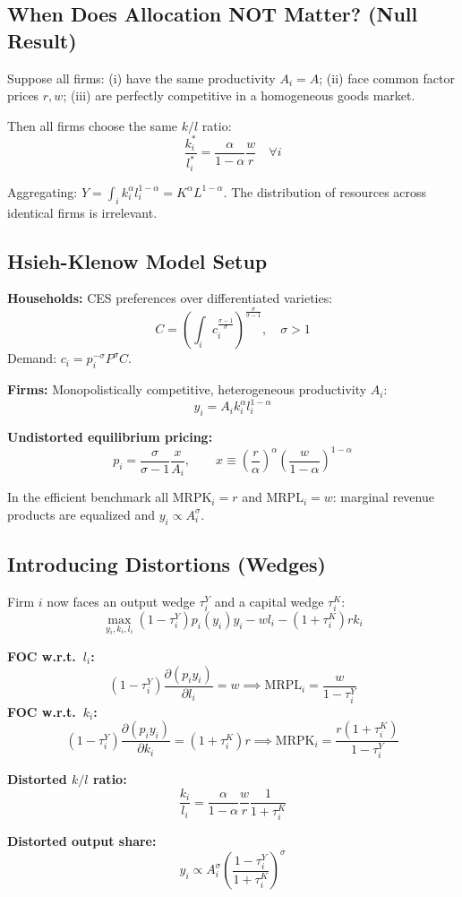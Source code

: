 \documentclass[a4paper,11pt]{article}
\newcommand{\MRPK}{\mathrm{MRPK}}
\newcommand{\MRPL}{\mathrm{MRPL}}
\begin{document}
\subsection*{When Does Allocation NOT Matter? (Null Result)}

Suppose all firms: (i) have the same productivity $A_i = A$; (ii) face common factor prices $r, w$; (iii) are perfectly competitive in a homogeneous goods market.

Then all firms choose the same $k/l$ ratio:
\[
\frac{k_i^*}{l_i^*} = \frac{\alpha}{1-\alpha}\frac{w}{r} \quad \forall i
\]

Aggregating: $Y = \int_i k_i^\alpha l_i^{1-\alpha} = K^\alpha L^{1-\alpha}$. The distribution of resources across identical firms is irrelevant.

\subsection*{Hsieh-Klenow Model Setup}

\textbf{Households:} CES preferences over differentiated varieties:
\[
C = \left(\int_i c_i^{\frac{\sigma-1}{\sigma}}\right)^{\frac{\sigma}{\sigma-1}}, \quad \sigma > 1
\]
Demand: $c_i = p_i^{-\sigma} P^\sigma C$.

\textbf{Firms:} Monopolistically competitive, heterogeneous productivity $A_i$:
\[
y_i = A_i k_i^\alpha l_i^{1-\alpha}
\tag{Firm Technology}
\]

\textbf{Undistorted equilibrium pricing:}
\[
p_i = \frac{\sigma}{\sigma-1} \frac{x}{A_i}, \qquad x \equiv \left(\frac{r}{\alpha}\right)^\alpha \left(\frac{w}{1-\alpha}\right)^{1-\alpha}
\]

In the efficient benchmark all $\MRPK_i = r$ and $\MRPL_i = w$: marginal revenue products are equalized and $y_i \propto A_i^\sigma$.

\subsection*{Introducing Distortions (Wedges)}

Firm $i$ now faces an output wedge $\tau_i^Y$ and a capital wedge $\tau_i^K$:
\[
\max_{y_i, k_i, l_i} (1-\tau_i^Y) p_i(y_i) y_i - w l_i - (1+\tau_i^K) r k_i
\]

\begin{derivationbox}[title={Derivation: Distorted MRPs}]
\textbf{FOC w.r.t.\ $l_i$:}
\[
(1-\tau_i^Y)\frac{\partial(p_i y_i)}{\partial l_i} = w \implies \MRPL_i = \frac{w}{1-\tau_i^Y}
\]
\textbf{FOC w.r.t.\ $k_i$:}
\[
(1-\tau_i^Y)\frac{\partial(p_i y_i)}{\partial k_i} = (1+\tau_i^K)r \implies \MRPK_i = \frac{r(1+\tau_i^K)}{1-\tau_i^Y}
\]

\textbf{Distorted $k/l$ ratio:}
\[
\frac{k_i}{l_i} = \frac{\alpha}{1-\alpha}\frac{w}{r} \frac{1}{1+\tau_i^K}
\]

\textbf{Distorted output share:}
\[
y_i \propto A_i^\sigma \left(\frac{1-\tau_i^Y}{1+\tau_i^K}\right)^\sigma
\]
\end{derivationbox}
\end{document}
